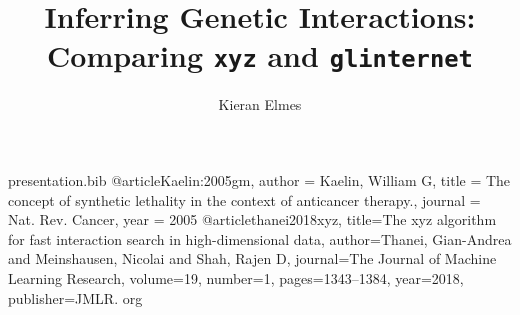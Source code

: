 \begin{filecontents*}{presentation.bib}
@article{Kaelin:2005gm,
	author = {Kaelin, William G},
	title = {{The concept of synthetic lethality in the context of anticancer therapy.}},
	journal = {Nat. Rev. Cancer},
	year = {2005}
}
@article{thanei2018xyz,
	title={The xyz algorithm for fast interaction search in high-dimensional data},
	author={Thanei, Gian-Andrea and Meinshausen, Nicolai and Shah, Rajen D},
	journal={The Journal of Machine Learning Research},
	volume={19},
	number={1},
	pages={1343--1384},
	year={2018},
	publisher={JMLR. org}
}
\end{filecontents*}

\documentclass[8pt]{beamer}

\usepackage[style=numeric,firstinits=true,backend=biber]{biblatex}

\usepackage{todonotes}



\title{Inferring Genetic Interactions: Comparing \texttt{xyz} and \texttt{glinternet}}
\author{Kieran Elmes}

\begin{frame}[plain]
    \maketitle
\end{frame}

